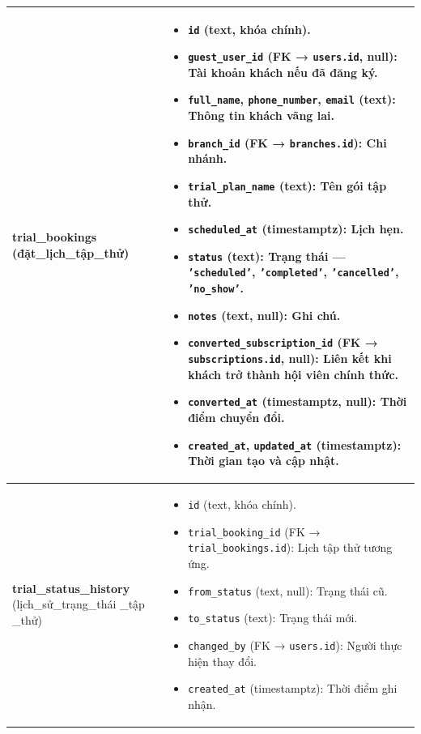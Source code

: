 \begin{longtable}{|>{\centering\arraybackslash}m{4.5cm}|>{\raggedright\arraybackslash}m{11.5cm}|}
\textbf{trial\_bookings} \newline (đặt\_lịch\_tập\_thử) &
\begin{itemize}
    \item \texttt{id} (text, khóa chính).
    \item \texttt{guest\_user\_id} (FK → \texttt{users.id}, null): Tài khoản khách nếu đã đăng ký.
    \item \texttt{full\_name}, \texttt{phone\_number}, \texttt{email} (text): Thông tin khách vãng lai.
    \item \texttt{branch\_id} (FK → \texttt{branches.id}): Chi nhánh.
    \item \texttt{trial\_plan\_name} (text): Tên gói tập thử.
    \item \texttt{scheduled\_at} (timestamptz): Lịch hẹn.
    \item \texttt{status} (text): Trạng thái — \texttt{'scheduled'}, \texttt{'completed'}, \texttt{'cancelled'}, \texttt{'no\_show'}.
    \item \texttt{notes} (text, null): Ghi chú.
    \item \texttt{converted\_subscription\_id} (FK → \texttt{subscriptions.id}, null): Liên kết khi khách trở thành hội viên chính thức.
    \item \texttt{converted\_at} (timestamptz, null): Thời điểm chuyển đổi.
    \item \texttt{created\_at}, \texttt{updated\_at} (timestamptz): Thời gian tạo và cập nhật.
\end{itemize} \\ \hline

\textbf{trial\_status\_history} \newline (lịch\_sử\_trạng\_thái \_tập \_thử) &
\begin{itemize}
    \item \texttt{id} (text, khóa chính).
    \item \texttt{trial\_booking\_id} (FK → \texttt{trial\_bookings.id}): Lịch tập thử tương ứng.
    \item \texttt{from\_status} (text, null): Trạng thái cũ.
    \item \texttt{to\_status} (text): Trạng thái mới.
    \item \texttt{changed\_by} (FK → \texttt{users.id}): Người thực hiện thay đổi.
    \item \texttt{created\_at} (timestamptz): Thời điểm ghi nhận.
\end{itemize} \\ \hline


\end{longtable}

